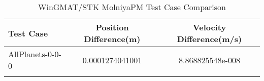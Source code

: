 \begin{table}[htbp!]
\centering
\caption{ WinGMAT/STK MolniyaPM Test Case Comparison}
      \begin{tabular}{lcc}
      \hline\hline
          Test Case & Position Difference(m) & Velocity Difference(m/s) \\
         \hline
         AllPlanets-0-0-0 & 0.0001274041001 & 8.868825548e-008 \\
      \hline\hline
      \label{Table: MolniyaPM WinGMAT-STK Table} 
\end{tabular}
\end{table}
